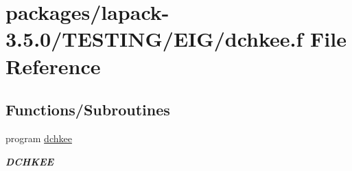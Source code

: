 \hypertarget{dchkee_8f}{}\section{packages/lapack-\/3.5.0/\+T\+E\+S\+T\+I\+N\+G/\+E\+I\+G/dchkee.f File Reference}
\label{dchkee_8f}
\subsection*{Functions/\+Subroutines}
\begin{DoxyCompactItemize}
\item 
program \hyperlink{group__double__eig_ga8356beeda2da8d0fef89ccb4bc414d5a}{dchkee}
\begin{DoxyCompactList}\small\item\em {\bfseries D\+C\+H\+K\+E\+E} \end{DoxyCompactList}\end{DoxyCompactItemize}
